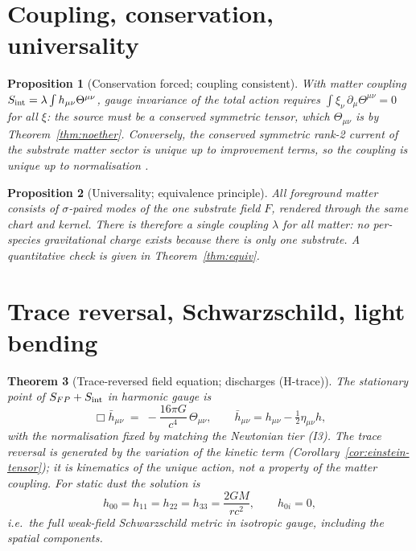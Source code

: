 \documentclass[12pt]{article}
\newtheorem{theorem}{Theorem}
\newtheorem{proposition}[theorem]{Proposition}
\theoremstyle{definition}
\theoremstyle{remark}
\newcommand{\Th}{\Theta}
\begin{document}
\section{Coupling, conservation, universality}\label{sec:coupling}

\begin{proposition}[Conservation forced; coupling consistent]\label{prop:conserved}
With matter coupling $S_{\rm int} = \lambda \int h_{\mu\nu}\Th^{\mu\nu}$, gauge invariance of the total action requires $\int \xi_\nu\,\partial_\mu\Th^{\mu\nu} = 0$ for all $\xi$: the source must be a conserved symmetric tensor, which $\Th_{\mu\nu}$ is by Theorem~\ref{thm:noether}. Conversely, the conserved symmetric rank-2 current of the substrate matter sector is unique up to improvement terms, so the coupling is unique up to normalisation \citep{Weinberg1964}.
\end{proposition}

\begin{proposition}[Universality; equivalence principle]\label{prop:universal}
All foreground matter consists of $\sigma$-paired modes of the one substrate field $F$, rendered through the same chart and kernel. There is therefore a single coupling $\lambda$ for all matter: no per-species gravitational charge exists because there is only one substrate. A quantitative check is given in Theorem~\ref{thm:equiv}.
\end{proposition}

\section{Trace reversal, Schwarzschild, light bending}\label{sec:schwarzschild}

\begin{theorem}[Trace-reversed field equation; discharges (H-trace)]\label{thm:trace}
The stationary point of $S_{FP} + S_{\rm int}$ in harmonic gauge is
\begin{equation}
\Box \bar h_{\mu\nu} \;=\; -\frac{16\pi G}{c^4}\,\Th_{\mu\nu}, \qquad \bar h_{\mu\nu} = h_{\mu\nu} - \tfrac12 \eta_{\mu\nu} h,
\label{eq:lin-einstein}
\end{equation}
with the normalisation fixed by matching the Newtonian tier (I3). The trace reversal is generated by the variation of the kinetic term (Corollary~\ref{cor:einstein-tensor}); it is kinematics of the unique action, not a property of the matter coupling. For static dust the solution is
\begin{equation}
h_{00} = h_{11} = h_{22} = h_{33} = \frac{2GM}{rc^2}, \qquad h_{0i} = 0,
\end{equation}
i.e.\ the full weak-field Schwarzschild metric in isotropic gauge, including the spatial components.
\end{theorem}
\end{document}
